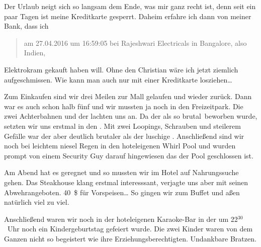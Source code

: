 Der Urlaub neigt sich so langsam dem Ende, was mir ganz recht ist, denn seit ein paar Tagen ist meine Kreditkarte gesperrt.
Daheim erfahre ich dann von meiner Bank, dass ich
\begin{quote}
	am 27.04.2016 um 16:59:05 bei Rajeshwari Electricals in Bangalore, also Indien, 
\end{quote}
Elektrokram gekauft haben will.
Ohne den Christian wäre ich jetzt ziemlich aufgeschmissen.
Wie kann man auch nur mit einer Kreditkarte losziehen\dots

Zum Einkaufen sind wir drei Meilen zur Mall gelaufen und wieder zurück.
Dann war es auch schon halb fünf und wir mussten ja noch in den  Freizeitpark.
Die zwei Achterbahnen  und der  lachten uns an.
Da der  als so \glqq brutal\grqq \, beworben wurde, setzten wir uns erstmal in den .
Mit zwei Loopings, Schrauben und steilerem Gefälle war der aber deutlich brutaler als der luschige .
Anschließend sind wir noch bei leichtem niesel Regen in den hoteleigenen Whirl Pool und wurden prompt von einem Security Guy darauf hingewiesen das der Pool geschlossen ist.

Am Abend hat es geregnet und so mussten wir im Hotel auf Nahrungssuche gehen.
Das Steakhouse klang erstmal interesssant, verjagte uns aber mit seinen Abwehrangeboten.
40~\$ für Vorspeisen\dots
So gingen wir zum Buffet und aßen natürlich viel zu viel.

Anschließend waren wir noch in der hoteleigenen Karaoke-Bar in der um 22$^{30}$~Uhr noch ein Kindergeburtstag gefeiert wurde.
Die zwei Kinder waren von dem Ganzen nicht so begeistert wie ihre Erziehungsberechtigten.
Undankbare Bratzen.
